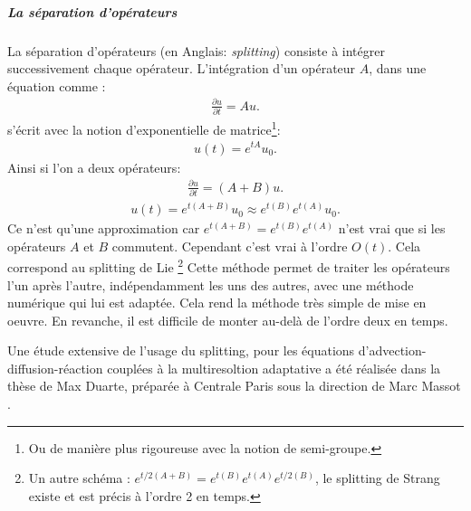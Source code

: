         \subparagraph{La séparation d'opérateurs}
            La séparation d'opérateurs (en Anglais: \textit{splitting}) consiste à intégrer successivement chaque opérateur.
            L'intégration d'un opérateur $A$, dans une équation comme :
            \begin{align}\frac{\partial u}{\partial t} = Au.\end{align}
            s'écrit avec la notion d'exponentielle de matrice\footnote{Ou de manière plus rigoureuse avec la notion de semi-groupe.}:
            \begin{align}u(t) = e^{tA}u_0.\end{align}
            Ainsi si l'on a deux opérateurs:
            \begin{align}\frac{\partial u}{\partial t} = (A+B)u.\end{align}
            \begin{align}u(t) = e^{t(A+B)}u_0 \approx e^{t(B)}e^{t(A)}u_0.\end{align}
            Ce n'est qu'une approximation car $e^{t(A+B)} = e^{t(B)}e^{t(A)}$ n'est vrai que si les opérateurs $A$ et $B$ commutent.
            Cependant c'est vrai à l'ordre $O(t)$. Cela correspond au splitting de Lie
            \footnote{Un autre schéma : $e^{t/2(A+B)} = e^{t(B)}e^{t(A)} e^{t/2(B)}$, le splitting de Strang existe et est précis à l'ordre 2 en temps.}
            Cette méthode permet de traiter les opérateurs l'un après l'autre, indépendamment les uns des autres, avec une méthode numérique qui lui est adaptée.
            Cela rend la méthode très simple de mise en oeuvre. En revanche, il est difficile de monter au-delà de l'ordre deux en temps.\par
            Une étude extensive de l'usage du splitting, pour les équations d'advection-diffusion-réaction couplées à la multiresoltion adaptative 
            a été réalisée dans la thèse de Max Duarte, préparée à Centrale Paris sous la direction de Marc Massot \cite{duart2011}.


